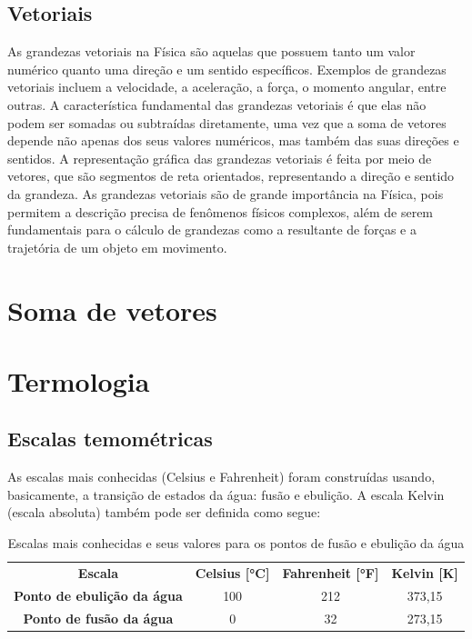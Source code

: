 \subsection{Vetoriais}
As grandezas vetoriais na Física são aquelas que possuem tanto um valor numérico quanto uma direção e um sentido específicos. Exemplos de grandezas vetoriais incluem a velocidade, a aceleração, a força, o momento angular, entre outras. A característica fundamental das grandezas vetoriais é que elas não podem ser somadas ou subtraídas diretamente, uma vez que a soma de vetores depende não apenas dos seus valores numéricos, mas também das suas direções e sentidos. A representação gráfica das grandezas vetoriais é feita por meio de vetores, que são segmentos de reta orientados, representando a direção e sentido da grandeza. As grandezas vetoriais são de grande importância na Física, pois permitem a descrição precisa de fenômenos físicos complexos, além de serem fundamentais para o cálculo de grandezas como a resultante de forças e a trajetória de um objeto em movimento.


\section{Soma de vetores}






\section{Termologia}
\subsection{Escalas temométricas}
As escalas mais conhecidas (Celsius e Fahrenheit) foram construídas usando, basicamente, a transição de estados da água: fusão e ebulição. A escala Kelvin (escala absoluta) também pode ser definida como segue:

\begin{table}[!h]
    \centering
    \caption{Escalas mais conhecidas e seus valores para os pontos de fusão e ebulição da água}
    \vspace{.5cm}
    \label{tab:my-table}
    \begin{tabular}{cccc}
    \textbf{Escala}                    & \textbf{Celsius {[}°C{]}} & \textbf{Fahrenheit {[}°F{]}} & \textbf{Kelvin {[}K{]}} \\
    \textbf{Ponto de ebulição da água} & 100                       & 212                          & 373,15                  \\
    \textbf{Ponto de fusão da água}    & 0                         & 32                           & 273,15                 
    \end{tabular}
\end{table}


